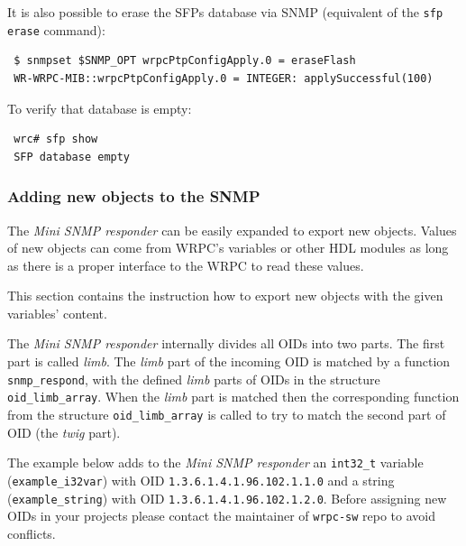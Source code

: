 \documentclass[a4paper, 12pt]{article}
\newcommand{\codeHook}[1]{\mbox{\ttfamily\MakeTextUppercase{#1}}}
\begin{document}
It is also possible to erase the SFPs database via SNMP (equivalent of
the \texttt{sfp erase} command):
\begin{lstlisting}
 $ snmpset $SNMP_OPT wrpcPtpConfigApply.0 = eraseFlash
 WR-WRPC-MIB::wrpcPtpConfigApply.0 = INTEGER: applySuccessful(100)
\end{lstlisting}

To verify that database is empty:
\begin{lstlisting}
 wrc# sfp show
 SFP database empty
\end{lstlisting}

\subsubsection{Adding new objects to the SNMP}
\label{Adding new objects to the SNMP}

The \textit{Mini SNMP responder} can be easily expanded to export new objects.
Values of new objects can come from \codeHook{wrpc}'s variables or other HDL modules
as long as there is a proper interface to the \codeHook{wrpc} to read these values.

This section contains the instruction how to export new objects with
the given variables' content.

The \textit{Mini SNMP responder} internally divides all OIDs into two parts.
The first part is called \textit{limb}. The \textit{limb} part of the incoming OID is
matched by a function \texttt{snmp\_respond}, with the defined \textit{limb} parts of OIDs
in the structure \texttt{oid\_limb\_array}.
When the \textit{limb} part is matched then the corresponding function from
the structure \texttt{oid\_limb\_array} is called to try to match the second part of
OID (the \textit{twig} part).

\begin{sloppypar} %
The example below adds to the \textit{Mini SNMP responder} an \texttt{int32\_t} variable
(\texttt{example\_i32var}) with OID \texttt{1.3.6.1.4.1.96.102.1.1.0} and a string
(\texttt{example\_string}) with OID \texttt{1.3.6.1.4.1.96.102.1.2.0}.
Before assigning new OIDs in your projects please contact the maintainer of
\texttt{wrpc-sw} repo to avoid conflicts.
\end{sloppypar}
\end{document}
